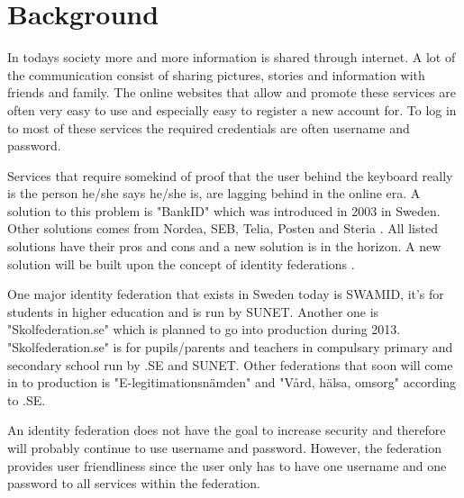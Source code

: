 \section{Background}
In todays society more and more information is shared through internet.
A lot of the communication consist of sharing pictures, stories and information with friends and family.
The online websites that allow and promote these services are often very easy to use and especially easy to register a new account for.
To log in to most of these services the required credentials are often username and password. 

Services that require somekind of proof that the user behind the keyboard really is the person he/she says he/she is, are lagging behind in the online era.
A solution to this problem is "BankID" which was introduced in 2003 \cite{website:bankid-about} in Sweden.
Other solutions comes from Nordea, SEB, Telia, Posten and Steria \cite[p.~256]{pdf:SOU}.
All listed solutions have their pros and cons and a new solution is in the horizon.
A new solution will be built upon the concept of identity federations \cite[p.~23]{pdf:SOU}.

One major identity federation that exists in Sweden today is SWAMID, it's for students in higher education and is run by SUNET.
Another one is "Skolfederation.se" which is planned to go into production during 2013.
"Skolfederation.se" is for pupils/parents and teachers in compulsary primary and secondary school run by .SE and SUNET. 
Other federations that soon will come in to production is "E-legitimationsn{\"a}mden" \cite{website:elegnamnd} and "V\r{a}rd, h{\"a}lsa, omsorg" according to .SE.  

An identity federation does not have the goal to increase security and therefore will probably continue to use username and password. 
However, the federation provides user friendliness since the user only has to have one username and one password to all services within the federation. 



